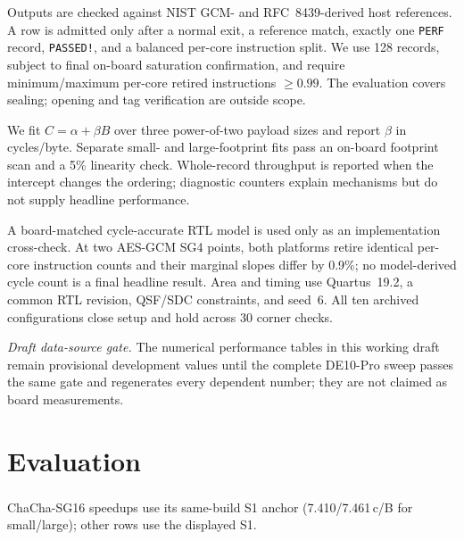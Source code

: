 \documentclass[conference]{IEEEtran}
\begin{document}
Outputs are checked against NIST GCM- and RFC~8439-derived host references. A
row is admitted only after a normal exit, a reference match, exactly one
\texttt{PERF} record, \texttt{PASSED!}, and a balanced per-core instruction
split. We use 128 records, subject to final on-board saturation confirmation,
and require minimum/maximum per-core retired instructions $\ge 0.99$. The
evaluation covers sealing; opening and tag verification are outside scope.

We fit $C=\alpha+\beta B$ over three power-of-two payload sizes and report
$\beta$ in cycles/byte. Separate small- and large-footprint fits pass an
on-board footprint scan and a 5\% linearity check. Whole-record throughput is
reported when the intercept changes the ordering; diagnostic counters explain
mechanisms but do not supply headline performance.

A board-matched cycle-accurate RTL model is used only as an implementation
cross-check. At two AES-GCM SG4 points, both platforms retire identical
per-core instruction counts and their marginal slopes differ by 0.9\%; no
model-derived cycle count is a final headline result. Area and timing use
Quartus~19.2, a common RTL revision, QSF/SDC constraints, and seed~6. All ten
archived configurations close setup and hold across 30 corner checks.

\noindent\emph{Draft data-source gate.} The numerical performance tables in
this working draft remain provisional development values until the complete
DE10-Pro sweep passes the same gate and regenerates every dependent number;
they are not claimed as board measurements.

\section{Evaluation}\label{sec:eval}

\begin{table}[t]
\centering
\caption{The tier ladder. Marginal cycles per byte at both operating points
(small-footprint and large-footprint fits), large-footprint instructions per byte,
and speedups against each algorithm's own S1 measured in the same build.
$\Delta$ALM is the whole build against the crypto-free two-core accelerator (183{,}971
ALMs); each build includes its lane-local parent units.}
\label{tab:tiers}
\scriptsize
\setlength{\tabcolsep}{3.2pt}

\vspace{1pt}

\parbox{\columnwidth}{\scriptsize
\textsuperscript{\dag}ChaCha-SG16 speedups use its same-build S1 anchor
(7.410/7.461\,c/B for small/large); other rows use the displayed S1.}
\end{table}
\end{document}
